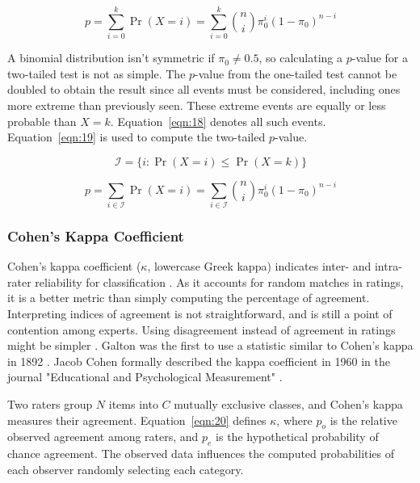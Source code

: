 \documentclass[sn-mathphys-num]{sn-jnl}%
\begin{document}
\begin{equation}
	p=\sum_{i=0}^{k}\Pr(X=i)=\sum_{i=0}^{k}{\binom{n}{i}}\pi_{0}^{i}(1-\pi_{0})^{n-i}
	\label{eqn:17}
\end{equation}

A binomial distribution isn't symmetric if $\pi_{0}\neq 0.5$, so calculating a $p$-value for a two-tailed test is not as simple. The $p$-value from the one-tailed test cannot be doubled to obtain the result since all events must be considered, including ones more extreme than previously seen. These extreme events are equally or less probable than $X=k$. Equation~\ref{eqn:18} denotes all such events. Equation~\ref{eqn:19} is used to compute the two-tailed $p$-value.

\begin{equation}
	{\mathcal{I}}=\{i\colon \Pr(X=i)\leq \Pr(X=k)\}
	\label{eqn:18}
\end{equation}

\begin{equation}
	p=\sum_{i\in {\mathcal{I}}}\Pr(X=i)=\sum_{i\in {\mathcal{I}}}{\binom{n}{i}}\pi_{0}^{i}(1-\pi_{0})^{n-i}
	\label{eqn:19}
\end{equation}

\subsubsection{Cohen's Kappa Coefficient}

Cohen's kappa coefficient ($\kappa$, lowercase Greek kappa) indicates inter- and intra-rater reliability for classification \cite{mchugh2012interrater}. As it accounts for random matches in ratings, it is a better metric than simply computing the percentage of agreement. Interpreting indices of agreement is not straightforward, and is still a point of contention among experts. Using disagreement instead of agreement in ratings might be simpler \cite{pontius2011death}. Galton was the first to use a statistic similar to Cohen's kappa in 1892 \cite{galton1892finger, smeeton1985early}. Jacob Cohen formally described the kappa coefficient in 1960 in the journal "Educational and Psychological Measurement" \cite{cohen1960coefficient}.

Two raters group $N$ items into $C$ mutually exclusive classes, and Cohen's kappa measures their agreement. Equation~\ref{eqn:20} defines $\kappa$, where $p_{o}$ is the relative observed agreement among raters, and $p_{e}$ is the hypothetical probability of chance agreement. The observed data influences the computed probabilities of each observer randomly selecting each category.
\end{document}
